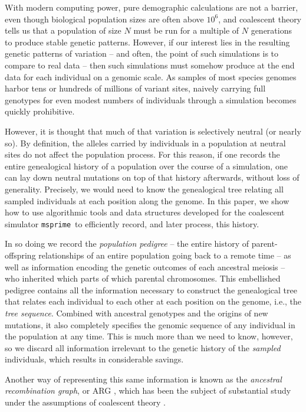 \documentclass{article}
\newcommand{\msprime}{\texttt{msprime}}
\begin{document}
With modern computing power, pure demographic calculations are not a barrier,
even though biological population sizes are often above $10^6$,
and coalescent theory tells us that a population of size $N$
must be run for a multiple of $N$ generations to produce stable genetic patterns.
However, if our interest lies in the resulting genetic patterns of variation
-- and often, the point of such simulations is to compare to real data --
then such simulations must somehow produce at the end data for each individual on a genomic scale.
As samples of most species genomes harbor tens or hundreds of millions of variant sites,
naively carrying full genotypes for even modest numbers of individuals through a simulation becomes quickly prohibitive.

However, it is thought that much of that variation is selectively neutral (or nearly so).
By definition, the alleles carried by individuals in a population at neutral sites
do not affect the population process.
For this reason, if one records the entire genealogical history of a population over the course of a simulation,
one can lay down neutral mutations on top of that history afterwards,
without loss of generality.
Precisely, we would need to know the genealogical tree relating all sampled individuals
at each position along the genome.
In this paper, we show how to use algorithmic tools and data structures developed for the coalescent simulator \msprime\
to efficiently record, and later process, this history.

In so doing we record the \emph{population pedigree} --
the entire history of parent-offspring relationships of an entire population going back to a remote time --
as well as information encoding the genetic outcomes of each ancestral meiosis --
who inherited which parts of which parental chromosomes.
This embellished pedigree contains all the information necessary 
to construct the genealogical tree that relates each individual to each other 
at each position on the genome, i.e., the \emph{tree sequence}.
Combined with ancestral genotypes and the origins of new mutations,
it also completely specifies the genomic sequence of any individual in the population at any time.
This is much more than we need to know, however,
so we discard all information irrelevant to the genetic history 
of the \emph{sampled} individuals,
which results in considerable savings.

Another way of representing this same information 
is known as the \emph{ancestral recombination graph}, or {ARG} \citep{griffiths1997ancestral},
which has been the subject of substantial study 
under the assumptions of coalescent theory \citep{wiuf1997number,wiuf1999ancestry,marjoram2006coalescent,wilton2015smc}.
\end{document}
